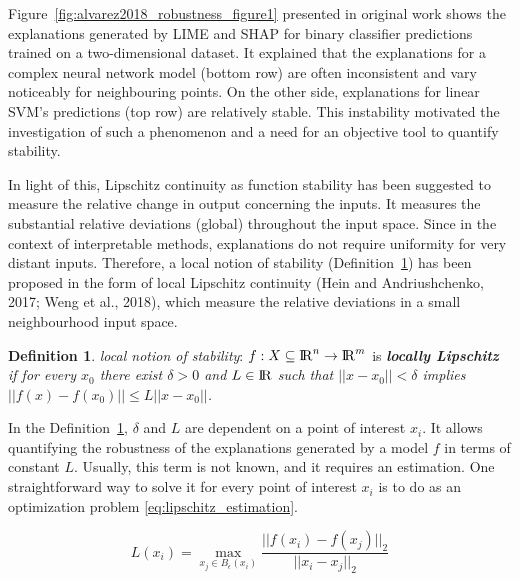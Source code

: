 \documentclass[english]{tktltiki2}
\theoremstyle{definition}
\newtheorem{definition}[thm]{Definition}
\theoremstyle{remark}
\begin{document}
Figure~\ref{fig:alvarez2018_robustness_figure1} presented in original work \citep{alvarez2018robustness} shows the explanations generated by LIME \cite{ribeiro2016should} and SHAP \cite{lundberg2017unified} for binary classifier predictions trained on a two-dimensional dataset. It explained that the explanations for a complex neural network model (bottom row) are often inconsistent and vary noticeably for neighbouring points. On the other side, explanations for linear SVM's predictions (top row) are relatively stable. This instability motivated the investigation of such a phenomenon and a need for an objective tool to quantify stability.

In light of this, Lipschitz continuity as function stability has been suggested to measure the relative change in output concerning the inputs. It measures the substantial relative deviations (global) throughout the input space. Since in the context of interpretable methods, explanations do not require uniformity for very distant inputs. Therefore, a local notion of stability (Definition~\ref{def:3}) has been proposed in the form of local Lipschitz continuity (Hein and Andriushchenko, 2017; Weng et al., 2018), which measure the relative deviations in a small neighbourhood input space.
\begin{definition}\label{def:3}{\textit{local notion of stability}:}
	$f: X \subseteq {\rm I\!R}^n \rightarrow {\rm I\!R}^m$ is \textbf{\textit{locally Lipschitz}} \textit{if for every $x_0$ there exist $\delta > 0$ and $L \in {\rm I\!R}$ such that $||x - x_0|| < \delta$ implies $||f(x) - f(x_0)|| \leq L||x - x_0||$.}
\end{definition}

In the Definition~\ref{def:3}, $\delta$ and $L$ are dependent on a point of interest $x_i$. It allows quantifying the robustness of the explanations generated by a model $f$ in terms of constant $L$. Usually, this term is not known, and it requires an estimation. One straightforward way to solve it for every point of interest $x_i$ is to do as an optimization problem \eqref{eq:lipschitz_estimation}.


\begin{equation}\label{eq:lipschitz_estimation}
L(x_i) = \operatorname*{max}_{x_j \in B_{\epsilon}(x_i)}  \frac{||f(x_i) - f(x_j)||_{2}}{||x_i - x_j||_{2}}
\end{equation}
\end{document}
